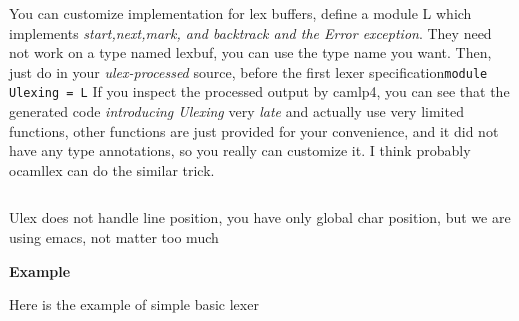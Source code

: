     You can customize implementation for lex buffers, define a module
L which implements \emph{start,next,mark, and backtrack and the Error
exception}.  They need not work on a type named lexbuf, you can use
the type name you want.  Then, just do in your \emph{ulex-processed}
source, before the first lexer specification\verb|module Ulexing = L|
If you inspect the processed output by camlp4, you can see that the
generated code \emph{introducing Ulexing } very \emph{late} and
actually use very limited functions, other functions are just provided
for your convenience, and it did not have any type annotations, so you
really can customize it. I think probably ocamllex can do the similar
trick.
    
\inputminted{ocaml}{code/ulex_intf.ml}
    
Ulex does not handle line position, you have only global char
position, but we are using emacs, not matter too much

\textbf{Example}

Here is the example of simple basic lexer 
\inputminted{ocaml}{code/basic_ulex.ml}

